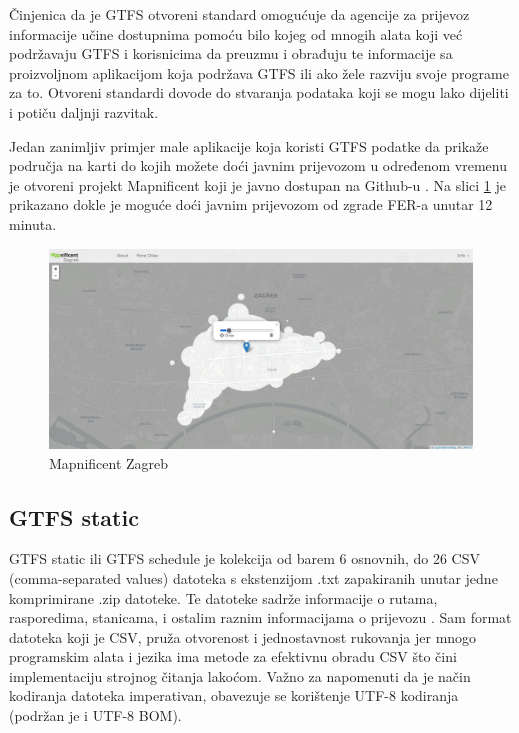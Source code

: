 \documentclass[zavrsnirad]{fer}
\begin{document}
Činjenica da je GTFS otvoreni standard omogućuje da agencije za prijevoz informacije učine dostupnima pomoću bilo kojeg od mnogih alata koji već podržavaju GTFS i korisnicima da preuzmu i obrađuju te informacije sa proizvoljnom aplikacijom koja podržava GTFS ili ako žele razviju svoje programe za to. Otvoreni standardi dovode do stvaranja podataka koji se mogu lako dijeliti i potiču daljnji razvitak.

Jedan zanimljiv primjer male aplikacije koja koristi GTFS podatke da prikaže područja na karti do kojih možete doći javnim prijevozom u određenom vremenu je otvoreni projekt Mapnificent koji je javno dostupan na Github-u \cite{Mapnificent}. Na slici \ref{slk:mapnificent-zagreb} je prikazano dokle je moguće doći javnim prijevozom od zgrade FER-a unutar 12 minuta. 

\begin{figure}[htb]
  \centering
  \includegraphics[width=0.9\linewidth]{Figures/mapnificent-zagreb.jpg} 
  \caption{Mapnificent Zagreb}
  \label{slk:mapnificent-zagreb}
\end{figure}

\subsection{GTFS static}

GTFS static ili GTFS schedule je kolekcija od barem 6 osnovnih, do 26 CSV (comma-separated
values) datoteka s ekstenzijom .txt zapakiranih unutar jedne komprimirane .zip datoteke. Te datoteke
sadrže informacije o rutama, rasporedima, stanicama, i ostalim raznim informacijama o prijevozu \cite{GTFS-schedule}. Sam format datoteka koji je CSV, pruža otvorenost i jednostavnost rukovanja jer mnogo programskim alata i jezika ima metode za efektivnu obradu CSV što čini implementaciju strojnog čitanja lakoćom. Važno za napomenuti da je način kodiranja datoteka imperativan, obavezuje se korištenje UTF-8 kodiranja (podržan je i UTF-8 BOM).
\end{document}
